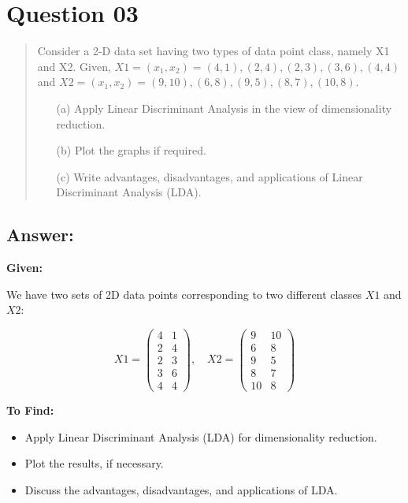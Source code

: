 \documentclass{exam}
\begin{document}
\section{Question 03}

\begin{quote}
Consider a 2-D data set having two types of data point class, namely X1 and X2. Given, \( X1 = (x_1, x_2) = (4, 1), (2, 4), (2, 3), (3, 6), (4, 4) \) and \( X2 = (x_1, x_2) = (9, 10), (6, 8), (9, 5), (8, 7), (10, 8) \).
\begin{itemize}
\item[(a)] Apply Linear Discriminant Analysis in the view of dimensionality reduction.
\item[(b)] Plot the graphs if required.
\item[(c)] Write advantages, disadvantages, and applications of Linear Discriminant Analysis (LDA).
\end{itemize}
\end{quote}

\subsection{Answer:}

\textbf{Given:}

We have two sets of 2D data points corresponding to two different classes \( X1 \) and \( X2 \):

\[
X1 = \begin{pmatrix} 4 & 1 \\ 2 & 4 \\ 2 & 3 \\ 3 & 6 \\ 4 & 4 \end{pmatrix}, \quad X2 = \begin{pmatrix} 9 & 10 \\ 6 & 8 \\ 9 & 5 \\ 8 & 7 \\ 10 & 8 \end{pmatrix}
\]

\textbf{To Find:} 
\begin{itemize}
    \item Apply Linear Discriminant Analysis (LDA) for dimensionality reduction.
    \item Plot the results, if necessary.
    \item Discuss the advantages, disadvantages, and applications of LDA.
\end{itemize}
\end{document}
